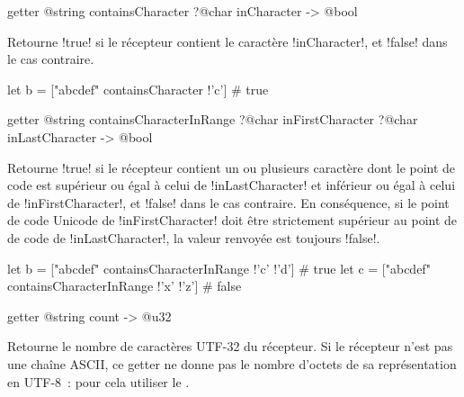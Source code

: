 
\begin{galgas4box}
getter @string containsCharacter ?@char inCharacter -> @bool
\end{galgas4box}
Retourne \ggsq!true! si le récepteur contient le caractère \ggsq!inCharacter!, et \ggsq!false! dans le cas contraire.

\begin{galgas4}
let b = ["abcdef" containsCharacter !'c'] # true
\end{galgas4}






\begin{galgas4box}
getter @string containsCharacterInRange
  ?@char inFirstCharacter
  ?@char inLastCharacter
  -> @bool
\end{galgas4box}

Retourne \ggsq!true! si le récepteur contient un ou plusieurs caractère dont le point de code est supérieur ou égal à celui de \ggsq!inLastCharacter! et inférieur ou égal à celui de \ggsq!inFirstCharacter!, et \ggsq!false! dans le cas contraire. En conséquence, si le point de code Unicode de \ggsq!inFirstCharacter! doit être strictement supérieur au point de de code de \ggsq!inLastCharacter!, la valeur renvoyée est toujours \ggsq!false!.

\begin{galgas4}
let b = ["abcdef" containsCharacterInRange !'c' !'d'] # true
let c = ["abcdef" containsCharacterInRange !'x' !'z'] # false
\end{galgas4}









\begin{galgas4box}
getter @string count -> @u32
\end{galgas4box}

Retourne le nombre de caractères UTF-32 du récepteur. Si le récepteur n'est pas une chaîne ASCII, ce getter ne donne pas le nombre d'octets de sa représentation en UTF-8~: pour cela utiliser le .










